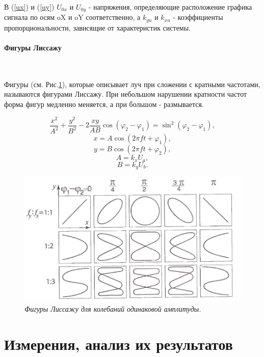 \documentclass[a4paper,12pt]{report}
\begin{document}
{	\text\par{В (\ref{ux}) и (\ref{uy}) $U_{0x}$ и $U_{0y}$ - напряжения, определяющие расположение графика сигнала по осям oX и oY соответственно, а $k_{yu}$ и $k_{xu}$ - коэффициенты пропорциональности, зависящие от характеристик системы.}
	
	\paragraph{\Large Фигуры Лиссажу} \text{ }
	\\
	\text\par{Фигуры (см. Рис.\ref{lab116ris2.png}), которые описывает луч при сложении с кратными частотами, называются фигурами Лиссажу. При небольшом нарушении кратности частот форма фигур медленно меняется, а при большом - размывается.}
	
	\begin{equation}
	\frac{x^2}{A^2}+\frac{y^2}{B^2}-2\frac{xy}{AB}\cos(\varphi_2-\varphi_1)=\sin^2(\varphi_2-\varphi_1),\label{traek}
	\end{equation}
	\[x=A\cos(2\pi ft+\varphi_1),\]
	\[y=B\cos(2\pi ft+\varphi_2),\] 
	\[A=k_xU_a,\]
	\[B=k_yU_b.\]
	
	\begin{figure}[h!]
	\begin{center}
	\includegraphics[scale=0.5]{lab116ris2.png}
	\end{center}
	\caption{\textit{Фигуры Лиссажу для колебаний одинаковой амплитуды.}} \label{lab116ris2.png}
	\end{figure}
	
	\section{\Large Измерения, анализ их результатов}
	
}
\end{document}
